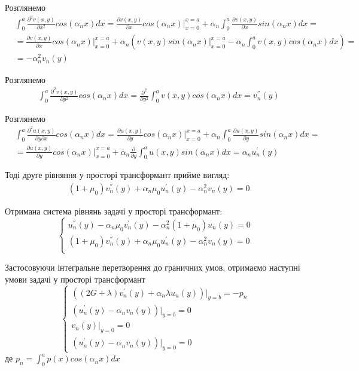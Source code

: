 Розглянемо
\begin{align*}
    &\int_{0}^{a} \frac{\partial^2 v(x,y)}{\partial x^2} cos(\alpha_n x)dx = \frac{\partial v(x,y)}{\partial x} cos(\alpha_n x) |_{x=0}^{x=a} + \alpha_n \int_{0}^{a} \frac{\partial v(x,y)}{\partial x} sin(\alpha_n x) dx = \\
    &=\frac{\partial v(x,y)}{\partial x} cos(\alpha_n x) |_{x=0}^{x=a} + \alpha_n \left(v(x,y) sin(\alpha_n x)|_{x=0}^{x=a} - \alpha_n \int_{0}^{a} v(x,y) cos(\alpha_n x) dx  \right) = \\
    &= -\alpha_n^2 v_n(y)
\end{align*}

Розглянемо
\begin{align*}
    &\int_{0}^{a} \frac{\partial^2 v(x,y)}{\partial y^2} cos(\alpha_n x)dx = \frac{\partial^2}{\partial y^2} \int_{0}^{a} v(x,y) cos(\alpha_n x)dx = v_n^{''}(y)
\end{align*}

Розглянемо
\begin{align*}
    &\int_{0}^{a} \frac{\partial^2 u(x,y)}{\partial y \partial x} cos(\alpha_n x)dx = \frac{\partial u(x,y)}{\partial y} cos(\alpha_n x) |_{x=0}^{x=a} + \alpha_n \int_{0}^{a} \frac{\partial u(x,y)}{\partial y} sin(\alpha_n x) dx = \\
    &=\frac{\partial u(x,y)}{\partial y} cos(\alpha_n x) |_{x=0}^{x=a} + \alpha_n \frac{\partial}{\partial y} \int_{0}^{a} u(x,y) sin(\alpha_n x) dx = \alpha_n u_n^{'}(y)
\end{align*}

Тоді друге рівняння у просторі трансформант прийме вигляд:
\begin{align*}
    &(1 + \mu_0) v_n^{''}(y) + \alpha_n \mu_0 u_n^{'}(y)  - \alpha_n^2 v_n(y) = 0
\end{align*}

Отримана система рівнянь задачі у просторі трансформант:
\begin{equation}\label{transf_static_1}
    \begin{cases}
        u_n^{''}(y) - \alpha_n \mu_0 v_n^{'}(y) - \alpha_n^2 (1 + \mu_0) u_n(y) = 0 \\
        (1 + \mu_0) v_n^{''}(y) + \alpha_n \mu_0 u_n^{'}(y)  - \alpha_n^2 v_n(y) = 0 \\
    \end{cases}
\end{equation}

Застосовуючи інтегральне перетворення до граничних умов,
отримаємо наступні умови задачі у просторі трансформант
\begin{equation}\label{transf_bound_static_1}
    \begin{cases}
        \left( (2G + \lambda)v_n^{'}(y) + \alpha_n \lambda u_n(y) \right)|_{y=b} = -p_n \\
        \left(u_n^{'}(y) - \alpha_n v_n(y)  \right)|_{y=b} = 0 \\
        v_n(y)|_{y=0} = 0 \\
        \left(u_n^{'}(y) - \alpha_n v_n(y)  \right)|_{y=0} = 0
    \end{cases}
\end{equation}
де $p_n = \int_{0}^{a} p(x) cos(\alpha_n x) dx$

